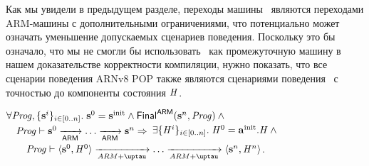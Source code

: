 Как мы увидели в предыдущем разделе, переходы машины \ARMt~являются
переходами ARM-машины с дополнительными ограничениями, что
потенциально может означать уменьшение допускаемых сценариев поведения.
Поскольку это бы означало, что мы не смогли бы использовать \ARMt~как промежуточную
машину в нашем доказательстве корректности компиляции,
нужно показать, что все сценарии поведения ARNv8 POP также являются сценариями
поведения \ARMt~с точностью до компоненты состояния $\mathit{H}$.
\begin{theorem}
  \label{thm:armvpop:armt:sim}
$\forall \mathit{Prog}, \{\mathbf{s}^i\}_{i \in [0..n]}.\; \mathbf{s}^0 = \mathbf{s}^{\rm init}  \land \mathsf{Final}^{\mathsf{ARM}}(\mathbf{s}^n, \mathit{Prog}) \land{}$ \\
${} \quad \mathit{Prog} \vdash \mathbf{s}^0 \xrightarrow[\mathsf{ARM}]{} \dots \xrightarrow[\mathsf{ARM}]{} \mathbf{s}^n \Rightarrow$
$\exists \{\mathit{H}^i\}_{i \in [0..n]}. \; \mathit{H}^0 = \mathbf{a}^{\rm init}.\mathit{H} \land {}$ \\
${} \qquad \Cfarm \vdash \angled{\s^0, \hmap^0} \armStep \dots \armStep \angled{\s^n, \hmap^n}$.
\end{theorem}
